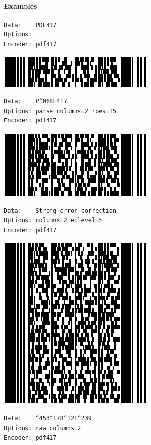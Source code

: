 \hypertarget{examples-11}{%
\paragraph{Examples}\label{examples-11}}

\begin{verbatim}
Data:    PDF417
Options: 
Encoder: pdf417
\end{verbatim}

\includegraphics{images/pdf417-1.eps}

\begin{verbatim}
Data:    P^068F417
Options: parse columns=2 rows=15
Encoder: pdf417
\end{verbatim}

\includegraphics{images/pdf417-2.eps}

\begin{verbatim}
Data:    Strong error correction
Options: columns=2 eclevel=5
Encoder: pdf417
\end{verbatim}

\includegraphics{images/pdf417-4.eps}

\begin{verbatim}
Data:    ^453^178^121^239
Options: raw columns=2
Encoder: pdf417
\end{verbatim}


